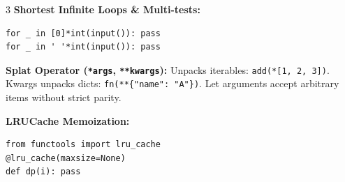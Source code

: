\documentclass[8pt,a4paper,landscape]{extarticle}
\begin{document}
\begin{multicols*}{3}
\textbf{Shortest Infinite Loops \& Multi-tests:}
\begin{lstlisting}
for _ in [0]*int(input()): pass
for _ in ' '*int(input()): pass
\end{lstlisting}

\textbf{Splat Operator (\texttt{*args}, \texttt{**kwargs}):}
Unpacks iterables: \texttt{add(*[1, 2, 3])}. Kwargs unpacks dicts: \texttt{fn(**\{"name": "A"\})}. Let arguments accept arbitrary items without strict parity.

\textbf{LRUCache Memoization:}
\begin{lstlisting}
from functools import lru_cache
@lru_cache(maxsize=None)
def dp(i): pass
\end{lstlisting}

\end{multicols*}
\end{document}
